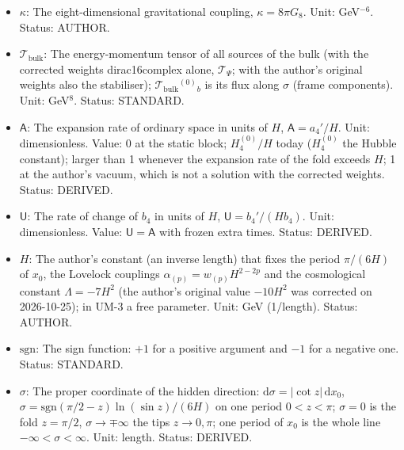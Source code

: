 \documentclass[
  10pt,
]{article}
\providecommand{\tightlist}{%
  \setlength{\itemsep}{0pt}\setlength{\parskip}{0pt}}
\begin{document}
\begin{itemize}
\tightlist
\item
  \(\kappa\): The eight-dimensional gravitational coupling,
  \(\kappa = 8\pi G_8\). Unit: GeV\(^{-6}\). Status: AUTHOR.
\item
  \(\mathcal{T}_{\mathrm{bulk}}\): The energy-momentum tensor of all
  sources of the bulk (with the corrected weights dirac16complex alone,
  \(\mathcal{T}_\Psi\); with the author's original weights also the
  stabiliser); \(\mathcal{T}_{\mathrm{bulk}}{}^{(0)}{}_b\) is its flux
  along \(\sigma\) (frame components). Unit: GeV\(^8\). Status:
  STANDARD.
\item
  \(\mathsf{A}\): The expansion rate of ordinary space in units of
  \(H\), \(\mathsf{A} = a_4'/H\). Unit: dimensionless. Value: 0 at the
  static block; \(H_4^{(0)}/H\) today (\(H_4^{(0)}\) the Hubble
  constant); larger than 1 whenever the expansion rate of the fold
  exceeds \(H\); 1 at the author's vacuum, which is not a solution with
  the corrected weights. Status: DERIVED.
\item
  \(\mathsf{U}\): The rate of change of \(b_4\) in units of \(H\),
  \(\mathsf{U} = b_4'/(Hb_4)\). Unit: dimensionless. Value:
  \(\mathsf{U} = \mathsf{A}\) with frozen extra times. Status: DERIVED.
\item
  \(H\): The author's constant (an inverse length) that fixes the period
  \(\pi/(6H)\) of \(x_0\), the Lovelock couplings
  \(\alpha_{(p)} = w_{(p)}H^{2-2p}\) and the cosmological constant
  \(\Lambda = -7H^2\) (the author's original value \(-10H^2\) was
  corrected on 2026-10-25); in UM-3 a free parameter. Unit: GeV
  (1/length). Status: AUTHOR.
\item
  \(\mathrm{sgn}\): The sign function: \(+1\) for a positive argument
  and \(-1\) for a negative one. Status: STANDARD.
\item
  \(\sigma\): The proper coordinate of the hidden direction:
  \(\mathrm{d}\sigma = \lvert\cot z\rvert\,\mathrm{d}x_0\),
  \(\sigma = \mathrm{sgn}(\pi/2 - z)\ln(\sin z)/(6H)\) on one period
  \(0 < z < \pi\); \(\sigma = 0\) is the fold \(z = \pi/2\),
  \(\sigma \to \mp\infty\) the tips \(z \to 0, \pi\); one period of
  \(x_0\) is the whole line \(-\infty < \sigma < \infty\). Unit: length.
  Status: DERIVED.
\end{itemize}
\end{document}
